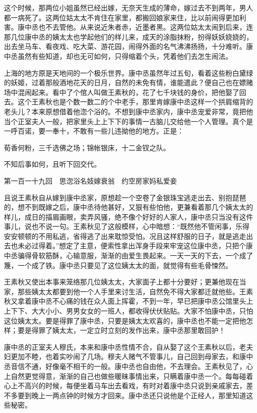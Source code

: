 \documentclass[12pt,UTF8]{ctexbook}
\begin{document}
{{{这个时候，那两位小姐虽然已经出嫁，无奈天生成的薄命，嫁过去不到两年，男人都一病死了。这两位姑太太不肯住在家里，都搬回娘家来住，比以前闹得更加利害。康中丞也不去管他。从来说近朱者赤，近墨者黑。这两位姑太太闹到后来，连那几位康中丞的姨太太也学起他们的样儿来，成天的涂脂抹粉，扮得妖妖娆娆的，出去坐马车、看夜戏、吃大菜、游花园，闹得外面的名气沸沸扬扬，十分难听。康中丞虽然有些知道，却也无可如何，只得缩着个头，凭着他们去怎生闹法。

上海的地方原是天地间的一个极乐世界。康中丞虽然年过五旬，看着这些粉白黛绿的妖姬，过着那般酒地花天的日月，自然的未免有情，谁能遣此？便自己也在嫖赌场中混闹起来。看中了个倌人叫做王素秋的，花了七千块钱的身价，把他娶了回去。这个王素秋也是个数一数二的个中老手，那里肯嫁康中丞这样一个拱肩缩背的老头儿？本来原想借着他淴个浴的。不想到康中丞家内，康中丞宠爱非常，竟把他当个正室夫人一般，把家里头上上下下的事情一古脑儿交给他一个人管理。真个是一呼百诺，要一奉十，不敢有一些儿违拗他的地方。正是：

荀香何粉，三千选佛之场；锦帐银床，十二金钗之队。

不知后事如何，且听下回交代。





第一百一十九回　思淴浴名妓嫁衰翁　约空房家妈私爱妾





且说王素秋自从嫁到康中丞家，原想趁一个空卷了金银珠宝逃走出去、别抱琵琶的，想不到既嫁之后，康中丞待他甚好，又狠有些怕他，更兼看着那几个姨太太的样儿，成日的描眉画眼，卖弄风骚，绝不像个好好的人家人，康中丞只当没有这件事儿，说也不说一句。王素秋见了这般模样，心中暗想：“既然他不管闲事，乐得安安顿顿的不用私逃，省得逃了出来耽惊受怕。况且这样舒服的日子，就是逃走出去也未必过得着。”想定了主意，便索性拿出浑身手段来牢宠这位康中丞，只把个康中丞骗得骨软筋酥，心输意服，渐渐的由爱生畏起来。一天一天的下去，一个成了篾，一个成了铁。康中丞只要见了这位姨太太的面，就觉得有些毛骨悚然。

王素秋又使出本事来笼络那几位姨太太，大家面子上都十分要好；更兼他现在当家，那些姨太太都要到他一个人手里来讨生活，自然免不得大家都迁就他些。王素秋又拿着康中丞不心痛的钱在众人面上挥霍，不到一年，早已把康中丞公馆里头上上下下、大大小小、男男女女的一班人，都收得伏伏贴贴。大家不怕康中丞，只怕这位姨太太。要是得罪了康中丞，只要是姨太太欢喜的，康中丞也不能一定把他怎样；要是得罪了姨太太，一定立时立刻的发作出来，康中丞那里敢回护！

康中丞的正室夫人穆氏，本来和康中丞性情不合，自从娶了这个王素秋以后，老夫妇更加不睦，也着实吵闹了几场。穆夫人赌气不管事儿，自己回到母家去，和康中丞音信不通，好像毫不相干的一般。康中丞也自由他，不去理会。王素秋见了，心上自然更觉得意，渐渐的自己也做些暖昧事情出来，只瞒着康中丞一个。每每碰着心上不高兴的时候，每便坐着马车出去看戏，有时对着康中丞只说到亲戚家去，差不多要到晚上一两点钟的时候方才回来。康中丞还只说他是个正经人，那里知道这些秘密。

}}}
\end{document}
